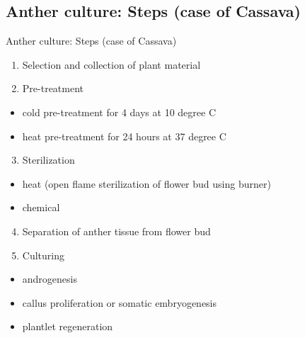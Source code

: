 \documentclass[
  ignorenonframetext,
  aspectratio=169]{beamer}
\providecommand{\tightlist}{%
  \setlength{\itemsep}{0pt}\setlength{\parskip}{0pt}}
\begin{document}
\hypertarget{anther-culture-steps-case-of-cassava}{%
\subsection{Anther culture: Steps (case of
Cassava)}\label{anther-culture-steps-case-of-cassava}}

\begin{frame}{Anther culture: Steps (case of Cassava)}
\begin{enumerate}
\tightlist
\item
  Selection and collection of plant material
\item
  Pre-treatment
\end{enumerate}

\begin{itemize}
\tightlist
\item
  cold pre-treatment for 4 days at 10 degree C
\item
  heat pre-treatment for 24 hours at 37 degree C
\end{itemize}

\begin{enumerate}
\setcounter{enumi}{2}
\tightlist
\item
  Sterilization
\end{enumerate}

\begin{itemize}
\tightlist
\item
  heat (open flame sterilization of flower bud using burner)
\item
  chemical
\end{itemize}

\begin{enumerate}
\setcounter{enumi}{3}
\tightlist
\item
  Separation of anther tissue from flower bud
\item
  Culturing
\end{enumerate}

\begin{itemize}
\tightlist
\item
  androgenesis
\item
  callus proliferation or somatic embryogenesis
\item
  plantlet regeneration
\end{itemize}
\end{frame}

\hypertarget{section}{%
\subsection{}\label{section}}
\end{document}
